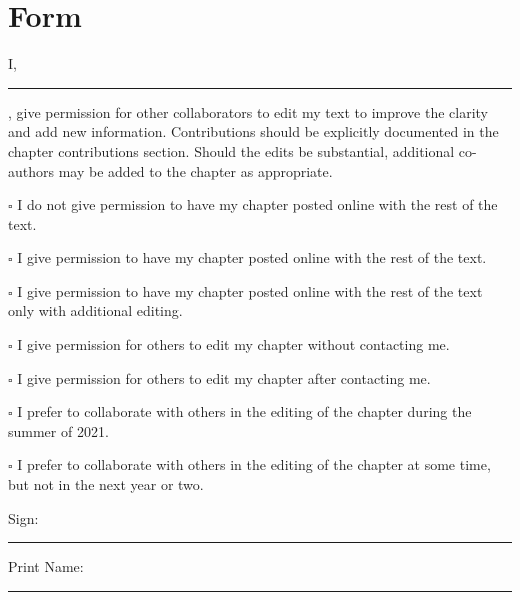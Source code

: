 \documentclass{book}\usepackage{knitr}
\begin{document}
\section*{Form}

I, \rule{3in}{0.4pt}, give permission for other collaborators to edit my text to improve the clarity and add new information. Contributions should be explicitly documented in the chapter contributions section. Should the edits be substantial, additional co-authors may be added to the chapter as appropriate. 

\bigskip

$\square$ I do not give permission to have my chapter posted online with the rest of the text.

\bigskip

$\square$ I give permission to have my chapter posted online with the rest of the text.

\bigskip

$\square$ I give permission to have my chapter posted online with the rest of the text only with additional editing.

\medskip

$\square$ I give permission for others to edit my chapter without contacting me.

\medskip

$\square$ I give permission for others to edit my chapter after contacting me.

\medskip

$\square$ I prefer to collaborate with others in the editing of the chapter during the summer of 2021.

\medskip

$\square$ I prefer to collaborate with others in the editing of the chapter at some time, but not in the next year or two.

\bigskip

\noindent Sign: \rule{3.4in}{0.4pt}

\bigskip
\noindent Print Name: \rule{3in}{0.4pt}
\end{document}
